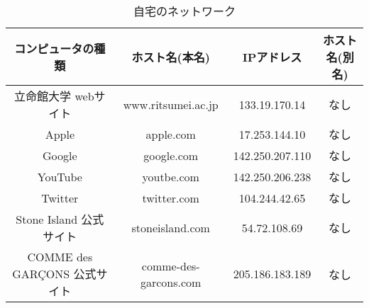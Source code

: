 \documentclass[dvipdfmx,autodetect-engine,titlepage]{jsarticle}
\begin{document}
  \begin{table}[h]
    \centering
    \caption{自宅のネットワーク}
    \begin{tabular}{|c|c|c|c|}
    \hline
    コンピュータの種類               & ホスト名(本名)              & IPアドレス          & ホスト名(別名) \\ \hline
    立命館大学 webサイト            & www.ritsumei.ac.jp    & 133.19.170.14   & なし       \\ \hline
    Apple                   & apple.com             & 17.253.144.10   & なし       \\ \hline
    Google                  & google.com            & 142.250.207.110 & なし       \\ \hline
    YouTube                 & youtbe.com            & 142.250.206.238 & なし       \\ \hline
    Twitter                 & twitter.com           & 104.244.42.65  & なし       \\ \hline
    Stone Island 公式サイト      & stoneisland.com       & 54.72.108.69    & なし       \\ \hline
    COMME des GARÇONS 公式サイト & comme-des-garcons.com & 205.186.183.189 & なし       \\ \hline
    \end{tabular}
    \end{table}
\end{document}
